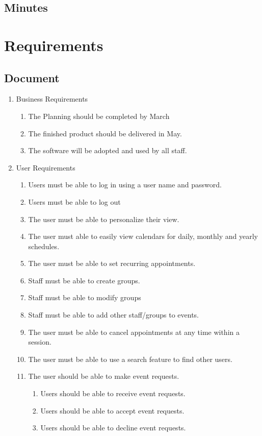 \documentclass[a4paper]{article}
\begin{document}
\subsection{Minutes}

\section{Requirements}

\subsection{Document} %

\begin{enumerate}
  \item Business Requirements
  \begin{enumerate}[label=B\arabic*.]
    \item The Planning should be completed by March 
    \item The finished product should be delivered in May.
    \item The software will be adopted and used by all staff.
  \end{enumerate}

  \item User Requirements
  \begin{enumerate}[label=U\arabic*.] 
    \item Users must be able to log in using a user name and password.
    \item Users must be able to log out
    \item The user must be able to personalize their view.
    \item The user must able to easily view calendars for daily, monthly and yearly schedules.
    \item The user must be able to set recurring appointments.
    \item Staff must be able to create groups.
    \item Staff must be able to modify groups
    \item Staff must be able to add other staff/groups to events.
    \item The user must be able to cancel appointments at any time within a session.
    \item The user must be able to use a search feature to find other users.
    \item The user should be able to make event requests. 
    \begin{enumerate}[label*=\arabic*.]
      \item Users should be able to receive event requests.
      \item Users should be able to accept event requests.
      \item Users should be able to decline event requests.
    \end{enumerate}
  \end{enumerate}


\end{enumerate}
\end{document}
